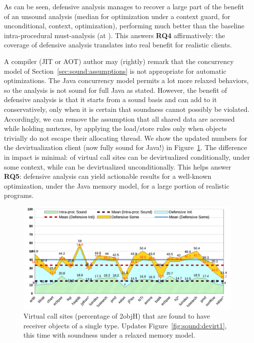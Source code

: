 As can be seen, defensive analysis manages to recover a large part of the benefit of an unsound analysis (median  for optimization under a context guard,  for unconditional, \ctxInit{} context, optimization), performing much better than the baseline intra-procedural must-analysis (at ). This answers \textbf{RQ4} affirmatively: the coverage of defensive analysis translates into real benefit for realistic clients.


A compiler (JIT or AOT) author may (rightly) remark that the concurrency model of Section~\ref{sec:sound:assumptions} is not appropriate for automatic optimizations. The Java concurrency model permits a lot more relaxed behaviors, so the analysis is not sound for full Java as stated. However, the benefit of defensive analysis is that it starts from a sound basis and can add to it conservatively, only when it is certain that soundness cannot possibly be violated. Accordingly, we can remove the assumption that all shared data are accessed while holding mutexes, by applying the load/store rules only when objects trivially do not escape their allocating thread. We show the updated numbers for the devirtualization client (now fully sound for Java!) in Figure~\ref{fig:sound:devirt2}. The difference in impact is minimal:  of virtual call sites can be devirtualized conditionally, under some context, while  can be devirtualized unconditionally. This helps answer \textbf{RQ5}: defensive analysis can yield actionable results for a well-known optimization, under the Java memory model, for a large portion of realistic programs.

\begin{figure}[tbh]
\centering
\includegraphics[width=\linewidth]{assets/defensive/devirt2.pdf}
\caption[Single typed, virtual call sites under a relaxed memory model]{Virtual call sites (percentage of 2objH) that are found to have receiver objects of a single type. Updates Figure~\ref{fig:sound:devirt1}, this time with soundness under a relaxed memory model.}
\label{fig:sound:devirt2}
\end{figure}


